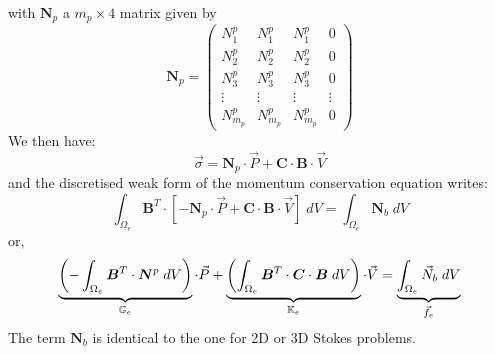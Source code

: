 with ${\bm N}_p$ a $m_p \times 4$ matrix given by
\[
{\bm N}_p
=
\left(
\begin{array}{cccc}
{N}_1^p & {N}_1^p & {N}_1^p & 0   \\
{N}_2^p & {N}_2^p & {N}_2^p & 0   \\
{N}_3^p & {N}_3^p & {N}_3^p & 0   \\
\vdots & \vdots & \vdots & \vdots  \\
{N}_{m_p}^p & {N}_{m_p}^p & {N}_{m_p}^p & 0 
\end{array}
\right)
\]
We then have:
\[
\vec{\sigma} = {\bm N}_p \cdot \vec{P} 
+ {\bm C} \cdot {\bm B} \cdot \vec{V}
\]
and the discretised weak form of the momentum conservation equation writes: 
\begin{equation}
\int_{\Omega_e} {\bm B}^T \cdot 
[ - {\bm N}_p  \cdot {\vec P}  + {\bm C} \cdot  {\bm B}\cdot {\vec V} ] \; dV
=
\int_{\Omega_e} {\bm N}_b \; dV
\end{equation}
or,
\begin{equation}
\underbrace{\left(-\int_{\Omega_e} {\bm B}^T \cdot 
{\bm N}^p  
\; dV \right)}_{{\mathbb{G}}_e} \cdot {\vec P} 
+
\underbrace{
\left(
\int_{\Omega_e} {\bm B}^T \cdot 
{\bm C} \cdot  {\bm B}
\; dV
\right)}_{{\mathbb{K}}_e}
\cdot {\vec V}
=
\underbrace{\int_{\Omega_e} {\vec N}_b \; dV }_{{\vec f}_e}
\end{equation}
The term ${\bm N}_b$ is identical to the one for 2D or 3D Stokes problems.


